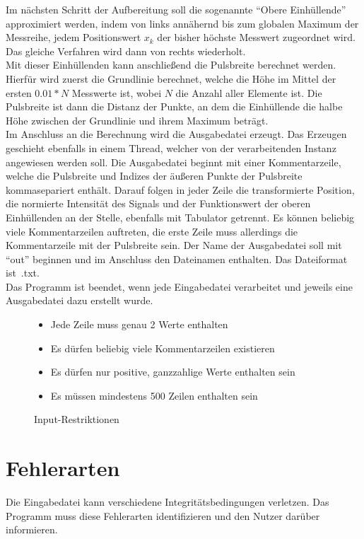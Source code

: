 Im nächsten Schritt der Aufbereitung soll die sogenannte \enquote{Obere Einhüllende} approximiert werden, indem von links annähernd bis zum globalen Maximum der Messreihe, jedem Positionswert $x_k$ der bisher höchste Messwert zugeordnet wird.
Das gleiche Verfahren wird dann von rechts wiederholt.\\
Mit dieser Einhüllenden kann anschließend die Pulsbreite berechnet werden.
Hierfür wird zuerst die Grundlinie berechnet, welche die Höhe im Mittel der ersten $0.01 * N$ Messwerte ist, wobei $N$ die Anzahl aller Elemente ist.
Die Pulsbreite ist dann die Distanz der Punkte, an dem die Einhüllende die halbe Höhe zwischen der Grundlinie und ihrem Maximum beträgt.\\

Im Anschluss an die Berechnung wird die Ausgabedatei erzeugt.
Das Erzeugen geschieht ebenfalls in einem Thread, welcher von der verarbeitenden Instanz angewiesen werden soll.
Die Ausgabedatei beginnt mit einer Kommentarzeile, welche die Pulsbreite und Indizes der äußeren Punkte der Pulsbreite kommasepariert enthält.
Darauf folgen in jeder Zeile die transformierte Position, die normierte Intensität des Signals und der Funktionswert der oberen Einhüllenden an der Stelle, ebenfalls mit Tabulator getrennt.
Es können beliebig viele Kommentarzeilen auftreten, die erste Zeile muss allerdings die Kommentarzeile mit der Pulsbreite sein.
Der Name der Ausgabedatei soll mit \enquote{out} beginnen und im Anschluss den Dateinamen enthalten.
Das Dateiformat ist~.txt.\\
Das Programm ist beendet, wenn jede Eingabedatei verarbeitet und jeweils eine Ausgabedatei dazu erstellt wurde.

\begin{figure}[h]
    \centering
    \caption{Input-Restriktionen}
    \begin{itemize}[noitemsep]
        \item Jede Zeile muss genau 2 Werte enthalten
        \item Es dürfen beliebig viele Kommentarzeilen existieren
        \item Es dürfen nur positive, ganzzahlige Werte enthalten sein
        \item Es müssen mindestens 500 Zeilen enthalten sein
    \end{itemize}
    \label{fig:input-restrictions}
\end{figure}


\section{Fehlerarten}\label{sec:fehlerarten}
Die Eingabedatei kann verschiedene Integritätsbedingungen verletzen.
Das Programm muss diese Fehlerarten identifizieren und den Nutzer darüber informieren.

